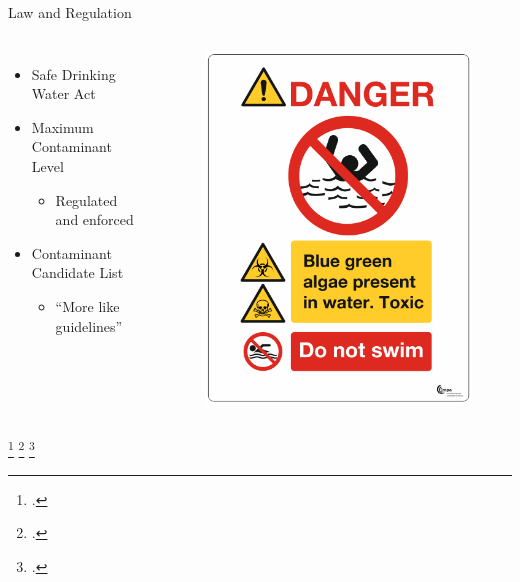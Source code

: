 \begin{frame}{Law and Regulation}
	\begin{columns}
	\begin{itemize}
		\item Safe Drinking Water Act \footnotemark 	
		\item Maximum Contaminant Level \footnotemark
		\begin{itemize}
			\item Regulated and enforced
		\end{itemize}
		\item Contaminant Candidate List  
		\begin{itemize}
			\item ``More like guidelines''
		\end{itemize}
	\end{itemize}

	\begin{figure}
		\centering
		\includegraphics[scale=0.3]{warning.PNG}
	\end{figure}
	
	\end{columns}
	\footcitetext{noauthor_guidelines_1998}
	\footcitetext{usepa_drinking_2016}
	\footcitetext{xue_spatio-temporal_2018}
\end{frame}


